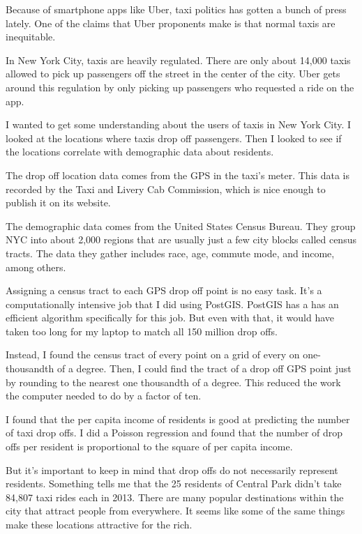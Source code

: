Because of smartphone apps like Uber, taxi politics has gotten a bunch of press lately. One of the claims that Uber proponents make is that normal taxis are inequitable. 

In New York City, taxis are heavily regulated. There are only about 14,000 taxis allowed to pick up passengers off the street in the center of the city. Uber gets around this regulation by only picking up passengers who requested a ride on the app.

I wanted to get some understanding about the users of taxis in New York City.  I looked at the locations where taxis drop off passengers. Then I looked to see if the locations correlate with demographic data about residents.

The drop off location data comes from the GPS in the taxi's meter. This data is recorded by the Taxi and Livery Cab Commission, which is nice enough to publish it on its website.

The demographic data comes from the United States Census Bureau.  They group NYC into about 2,000 regions that are usually just a few city blocks called census tracts. The data they gather includes race, age, commute mode, and income, among others.

Assigning a census tract to each GPS drop off point is no easy task. It's a computationally intensive job that I did using PostGIS. PostGIS has a has an efficient algorithm specifically for this job. But even with that, it would have taken too long for my laptop to match all 150 million drop offs.

Instead, I found the census tract of every point on a grid of every on one-thousandth of a degree. Then, I could find the tract of a drop off GPS point just by rounding to the nearest one thousandth of a degree. This reduced the work the computer needed to do by a factor of ten.

I found that the per capita income of residents is good at predicting the number of taxi drop offs. I did a Poisson regression and found that the number of drop offs per resident is proportional to the square of per capita income.

But it's important to keep in mind that drop offs do not necessarily represent residents. Something tells me that the 25 residents of Central Park didn't take 84,807 taxi rides each in 2013. There are many popular destinations within the city that attract people from everywhere. It seems like some of the same things make these locations attractive for the rich.

